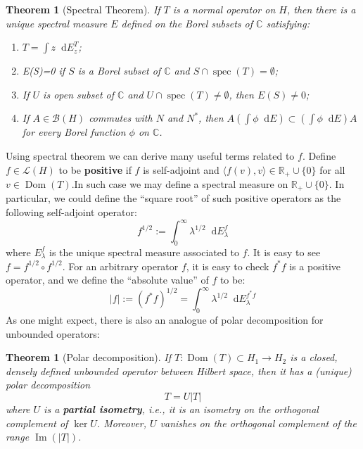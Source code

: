 \documentclass[11pt]{report}
\theoremstyle{definition}
\theoremstyle{plain}
\newtheorem{Theo}[Def]{Theorem}
\DeclareMathOperator{\im}{Im}
\DeclareMathOperator{\dom}{Dom}
\DeclareMathOperator{\spec}{spec}
\newcommand{\real}{\mathbb{R}}
\newcommand{\complex}{\mathbb{C}}
\newcommand{\bdd}{\mathcal{B}}
\newcommand{\brac}[1]{\langle #1 \rangle}
\newcommand{\mass}[1]{\mathop{}\mathrm{d}{#1}}
\begin{document}
\begin{Theo}
	[Spectral Theorem]\textnormal{\cite[Chapter~X, Theorem~4.11]{conway2013}}\label{normalspec} If $T$ is a normal operator on $H$, then there is a unique spectral measure $E$ defined on the Borel subsets of $\complex$ satisfying:
	\begin{enumerate}
		\item  $T=\int z \mass{E^T_z}$;
		\item E(S)=0 if $S$ is a Borel subset of $\complex$ and $S\cap \spec(T)=\emptyset$;
		\item If $U$ is open subset of $\complex$ and $U\cap \spec(T)\neq \emptyset$, then $E(S)\neq 0$;
		\item If $A\in \bdd(H)$ commutes with $N$ and $N^*$, then $A(\int\phi \mass{E})\subset (\int\phi \mass{E})A$ for every Borel function $\phi$ on $\complex$.
	\end{enumerate}
\end{Theo}
Using spectral theorem we can derive many useful terms related to $f$. Define $f\in \mathcal{L}(H)$ to be \textbf{positive} if $f$ is self-adjoint and $\brac{f(v),v}\in \real_+\cup \{0\}$ for all $v\in \dom(T)$.In such case we may define a spectral measure on $\real_+\cup \{0\}$. In particular, we could define the ``square root'' of such positive operators as the following self-adjoint operator:
\begin{equation}
f^{1/2}:=\int_0^\infty \lambda^{1/2} \mass{E^f_\lambda}
\end{equation} 
where $E^f_\lambda$ is the unique spectral measure associated to $f$. It is easy to see $f=f^{1/2}\circ f^{1/2}$.  For an arbitrary operator $f$, it is easy to check $f^*f$ is a positive operator, and we define the ``absolute value'' of $f$ to be:
\begin{equation*}
|f|:=(f^*f)^{1/2}=\int_{0}^{\infty}\lambda^{1/2} \mass{E^{f^*f}_\lambda}
\end{equation*}
As one might expect, there is also an analogue of polar decomposition for unbounded operators:
\begin{Theo}[Polar decomposition]\label{polar decomposition}
	If $T:\dom(T)\subset H_1\to H_2$ is a closed, densely defined unbounded operator between Hilbert space, then it has a (unique) polar decomposition
\begin{equation}
T=U|T|
\end{equation}
	where $U$ is a \textbf{partial isometry}, i.e., it is an isometry on the orthogonal complement of $\ker U$. Moreover, $U$ vanishes on the orthogonal complement of the range $\im(|T|)$.
\end{Theo}
\end{document}
